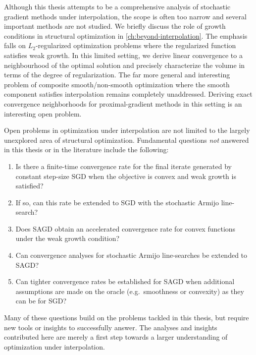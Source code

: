 Although this thesis attempts to be a comprehensive analysis of stochastic gradient methods under interpolation, the scope is often too narrow and several important methods are not studied.
We briefly discuss the role of growth conditions in structural optimization in \autoref{ch:beyond-interpolation}.
The emphasis falls on \( L_2 \)-regularized optimization problems where the regularized function satisfies weak growth.
In this limited setting, we derive linear convergence to a neighbourhood of the optimal solution and precisely characterize the volume in terms of the degree of regularization. 
The far more general and interesting problem of composite smooth/non-smooth optimization where the smooth component satisfies interpolation remains completely unaddressed.
Deriving exact convergence neighborhoods for proximal-gradient methods in this setting is an interesting open problem.

Open problems in optimization under interpolation are not limited to the largely unexplored area of structural optimization. 
Fundamental questions \emph{not} answered in this thesis or in the literature include the following: 
\begin{enumerate}
    \item Is there a finite-time convergence rate for the final iterate generated by constant step-size SGD when the objective is convex and weak growth is satisfied? 
    \item If so, can this rate be extended to \ac{SGD} with the stochastic Armijo line-search? 
    \item Does \ac{SAGD} obtain an accelerated convergence rate for convex functions under the weak growth condition?
    \item Can convergence analyses for stochastic Armijo line-searches be extended to \ac{SAGD}? 
    \item Can tighter convergence rates be established for \ac{SAGD} when additional assumptions are made on the oracle (e.g.\ smoothness or convexity) as they can be for \ac{SGD}?
\end{enumerate}
Many of these questions build on the problems tackled in this thesis, but require new tools or insights to successfully answer. 
The analyses and insights contributed here are merely a first step towards a larger understanding of optimization under interpolation. 



